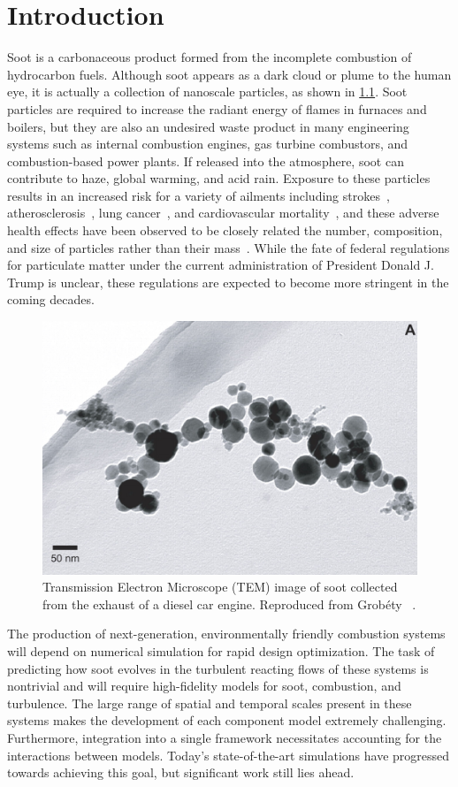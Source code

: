 \chapter{Introduction\label{ch:intro}}
 
Soot is a carbonaceous product formed from the incomplete combustion of hydrocarbon fuels. Although soot appears as a dark cloud or plume to the human eye, it is actually a collection of nanoscale particles, as shown in \cref{fig:intro:dieselsoot}. Soot particles are required to increase the radiant energy of flames in furnaces and boilers, but they are also an undesired waste product in many engineering systems such as internal combustion engines, gas turbine combustors, and combustion-based power plants. If released into the atmosphere, soot can contribute to haze, global warming, and acid rain. Exposure to these particles results in an increased risk for a variety of ailments including strokes~\cite{popeiii2006}, atherosclerosis~\cite{polichetti2009,kennedy2007,popeiii2006}, lung cancer~\cite{kennedy2007,popeiii2006}, and cardiovascular mortality~\cite{polichetti2009,kennedy2007,popeiii2006}, and these adverse health effects have been observed to be closely related the number, composition, and size of particles rather than their mass~\cite{seaton1995,lighty2000}. While the fate of federal regulations for particulate matter under the current administration of President Donald J. Trump is unclear, these regulations are expected to become more stringent in the coming decades. 

\begin{figure}[htb]
  \centering
  \includegraphics[width=0.4\linewidth]{ch-intro/figures/diesel-soot}
  \caption[Soot From Diesel Car Engine]{Transmission Electron Microscope (TEM) image of soot collected from the exhaust of a diesel car engine. Reproduced from Grob\'ety \etal~\cite{grobety2010}.}
  \label{fig:intro:dieselsoot}
\end{figure}

The production of next-generation, environmentally friendly combustion systems will depend on numerical simulation for rapid design optimization. The task of predicting how soot evolves in the turbulent reacting flows of these systems is nontrivial and will require high-fidelity models for soot, combustion, and turbulence. The large range of spatial and temporal scales present in these systems makes the development of each component model extremely challenging. Furthermore, integration into a single framework necessitates accounting for the interactions between models. Today's state-of-the-art simulations have progressed towards achieving this goal, but significant work still lies ahead. 

